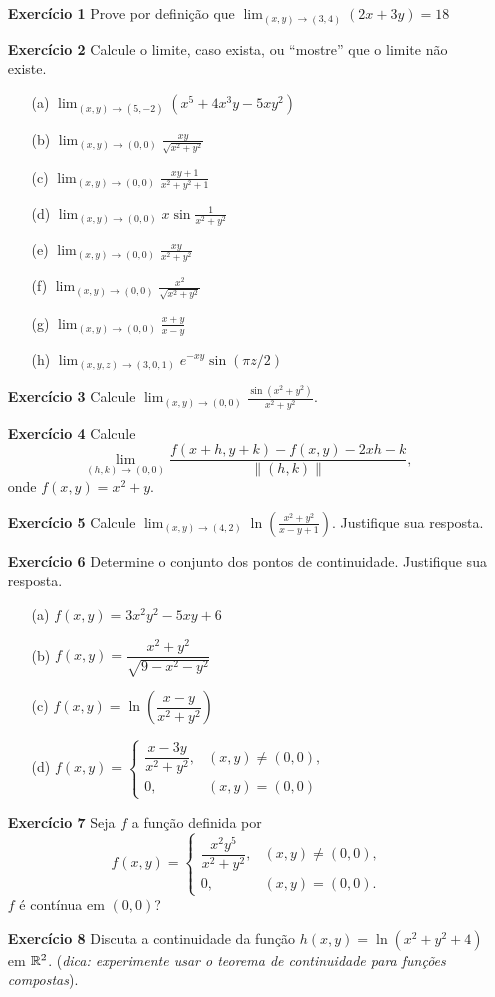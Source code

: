 \begin{enumerate}
    \item[\textbf{Exercício 1}] Prove por definição que $\lim_{(x,y)\to(3,4)}(2x + 3y) = 18$ 
    \item[\textbf{Exercício 2}] Calcule o limite, caso exista, ou ``mostre'' que o limite não existe. 
        \begin{enumerate}
            \item[(a)] $\lim_{(x,y)\to(5,-2)} (x^5 + 4x^3y - 5xy^2)$
            \item[(b)] $\lim_{(x,y)\to(0,0)} \frac{xy}{\sqrt{x^2+y^2}}$ 
            \item[(c)] $\lim_{(x,y)\to(0,0)} \frac{xy+1}{x^2+y^2+1}$ 
            \item[(d)] $\lim_{(x,y)\to(0,0)} x \sin \frac{1}{x^2+y^2}$ 
            \item[(e)] $\lim_{(x,y)\to(0,0)} \frac{xy}{x^2+y^2}$ 
            \item[(f)] $\lim_{(x,y)\to(0,0)} \frac{x^2}{\sqrt{x^2+y^2}}$ 
            \item[(g)] $\lim_{(x,y)\to(0,0)} \frac{x+y}{x-y}$ 
            \item[(h)] $\lim_{(x,y,z)\to(3,0,1)} e^{-xy} \sin(\pi z / 2)$ 
        \end{enumerate}
    \item[\textbf{Exercício 3}] Calcule $\lim_{(x,y)\to(0,0)} \frac{\sin(x^2+y^2)}{x^2+y^2}$. 
    \item[\textbf{Exercício 4}] Calcule 
        \[
        \lim_{(h,k)\to(0,0)} \frac{f(x+h, y+k) - f(x,y) - 2xh - k}{\|(h,k)\|}, 
        \]
    onde $f(x,y) = x^2 + y$. 
    \item[\textbf{Exercício 5}] Calcule $\lim_{(x,y)\to(4,2)} \ln \left( \frac{x^2+y^2}{x-y+1} \right)$. Justifique sua resposta.
    \item[\textbf{Exercício 6}] Determine o conjunto dos pontos de continuidade. Justifique sua resposta.
    \begin{enumerate}
        \item[(a)] $f(x,y) = 3x^2y^2 - 5xy + 6$
        \hfill
        \item[(b)] $f(x,y) = \dfrac{x^2+y^2}{\sqrt{9-x^2-y^2}}$
        \item[(c)] $f(x,y) = \ln \left( \dfrac{x-y}{x^2+y^2} \right)$
        \item[(d)] $f(x,y) = \begin{cases} \dfrac{x-3y}{x^2+y^2}, & (x,y) \neq (0,0), \\ 0, & (x,y) = (0,0) \end{cases}$
    \end{enumerate}
    \item[\textbf{Exercício 7}] Seja $f$ a função definida por
        $$f(x,y) = \begin{cases} \dfrac{x^2y^5}{x^2+y^2}, & (x,y) \neq (0,0), \\ 0, & (x,y) = (0,0). \end{cases}$$
    $f$ é contínua em $(0,0)$?
    \item[\textbf{Exercício 8}] Discuta a continuidade da função \(h(x,y) = \ln(x^2 + y^2 + 4)\) em \(\mathbb{R}^2\). (\textit{dica: experimente usar o teorema de continuidade para funções compostas}).
    
\end{enumerate}